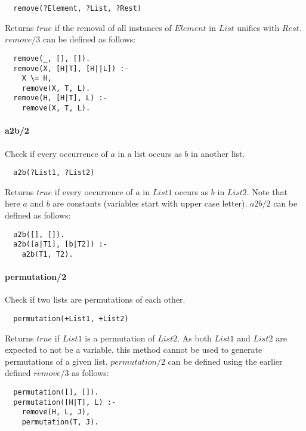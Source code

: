 \documentclass{article}
\begin{document}
\begin{multicols}{2}
  \begin{lstlisting}
  remove(?Element, ?List, ?Rest)
  \end{lstlisting}
  
  Returns $true$ if the removal of all instances of $Element$ in $List$ unifies with $Rest$. $remove/3$ can be defined as follows:

  \begin{lstlisting}
  remove(_, [], []).
  remove(X, [H|T], [H||L]) :-
    X \= H,
    remove(X, T, L).
  remove(H, [H|T], L) :-
    remove(X, T, L).
  \end{lstlisting}  
  
  \paragraph{a2b/2} Check if every occurrence of $a$ in a list occurs as $b$ in another list.
  
  \begin{lstlisting}
  a2b(?List1, ?List2)
  \end{lstlisting}
  
  Returns $true$ if every occurrence of $a$ in $List1$ occurs as $b$ in $List2$. Note that here $a$ and $b$ are constants (variables start with upper case letter). $a2b/2$ can be defined as follows:

  \begin{lstlisting}
  a2b([], []).
  a2b([a|T1], [b|T2]) :-
    a2b(T1, T2).
  \end{lstlisting}   

  \paragraph{permutation/2} Check if two lists are permutations of each other.
  
  \begin{lstlisting}
  permutation(+List1, +List2)
  \end{lstlisting}
  
  Returns $true$ if $List1$ is a permutation of $List2$. As both $List1$ and $List2$ are expected to not be a variable, this method cannot be used to generate permutations of a given list. $permutation/2$ can be defined using the earlier defined $remove/3$ as follows:

  \begin{lstlisting}
  permutation([], []).
  permutation([H|T], L) :-
    remove(H, L, J),
    permutation(T, J).
  \end{lstlisting}  
  

\end{multicols}
\end{document}
